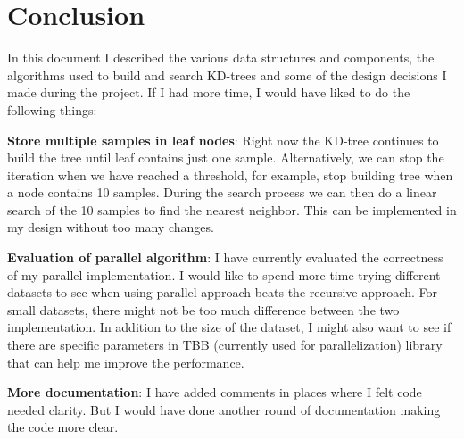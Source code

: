 \documentclass[11pt]{amsart}
\begin{document}
\section{Conclusion}
\label{sec:conclusion}
In this document I described the various data structures and components, the algorithms used to build and search KD-trees and some of the design decisions I made during the project. If I had more time, I would have liked to do the following things:
\begin{list}{}{\leftmargin= 1.4cm} \setlength\itemsep{1em}
\item \textbf{Store multiple samples in leaf nodes}: Right now the KD-tree continues to build the tree until leaf contains just one sample. Alternatively, we can stop the iteration when we have reached a threshold, for example, stop building tree when a node contains 10 samples. During the search process we can then do a linear search of the 10 samples to find the nearest neighbor. This can be implemented in my design without too many changes.
\item \textbf{Evaluation of parallel algorithm}: I have currently evaluated the correctness of my parallel implementation. I would like to spend more time trying different datasets to see when using parallel approach beats the recursive approach. For small datasets, there might not be too much difference between the two implementation. In addition to the size of the dataset, I might also want to see if there are specific parameters in TBB \cite{Reinders:2007:ITB:1461409} (currently used for parallelization) library that can help me improve the performance.
\item \textbf{More documentation}: I have added comments in places where I felt code needed clarity. But I would have done another round of documentation making the code more clear. 
\end{list}

 
 
\end{document}
